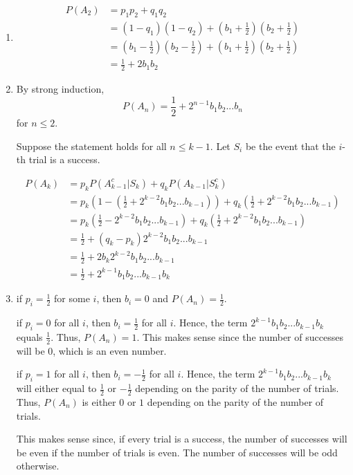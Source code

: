 \begin{enumerate}[label=(\alph*)]
\item
\begin{align*}
P(A_{2}) &= p_{1}p_{2} + q_{1}q_{2} \\
&= (1-q_{1})(1-q_{2}) + \left(b_{1} + \frac{1}{2}\right)\left(b_{2} + \frac{1}
{2}\right) \\
&= \left(b_{1} - \frac{1}{2}\right)\left(b_{2} - \frac{1}{2}\right) + \left(b_
{1} + \frac{1}{2}\right)\left(b_{2} + \frac{1}
{2}\right) \\
&= \frac{1}{2} + 2b_{1}b_{2}
\end{align*}

\item 
By strong induction, $$P(A_{n}) = \frac{1}{2} + 2^{n-1}b_{1}b_{2}...b_{n}$$ for
$n \leq 2.$

Suppose the statement holds for all $n \leq k-1$.
Let $S_{i}$ be the event that the $i$-th trial is a success.

\begin{align*}
P(A_{k}) &= p_{k}P(A_{k-1}^{c} | S_{k}) + q_{k}P(A_{k-1} | S_{k}^{c}) \\
&= p_{k}\left(1 - \left(\frac{1}{2} + 2^{k-2}b_{1}b_{2}...b_{k-1}\right)\right)
+ q_{k}\left(\frac{1}{2} + 2^{k-2}b_{1}b_{2}...b_{k-1}\right) \\
&= p_{k}\left(\frac{1}{2} - 2^{k-2}b_{1}b_{2}...b_{k-1}\right) + q_{k}\left(
\frac{1}{2} + 2^{k-2}b_{1}b_{2}...b_{k-1}\right) \\
&= \frac{1}{2} + (q_{k} - p_{k})2^{k-2}b_{1}b_{2}...b_{k-1} \\
&= \frac{1}{2} + 2b_{k}2^{k-2}b_{1}b_{2}...b_{k-1} \\
&= \frac{1}{2} + 2^{k-1}b_{1}b_{2}...b_{k-1}b_{k}
\end{align*}

\item
if $p_{i} = \frac{1}{2}$ for some $i$, then $b_{i} = 0$ and $P(A_{n}) = \frac{1}
{2}.$

if $p_{i} = 0$ for all $i$, then $b_{i} = \frac{1}{2}$ for all $i$. Hence,
the term $2^{k-1}b_{1}b_{2}...b_{k-1}b_{k}$ equals $\frac{1}{2}$. Thus, $P(A_
{n}) = 1.$ This makes sense since the number of successes will be $0$, which is
an even number.

if $p_{i} = 1$ for all $i$, then $b_{i} = -\frac{1}{2}$ for all $i$. Hence, the
term $2^{k-1}b_{1}b_{2}...b_{k-1}b_{k}$ will either equal to $\frac{1}{2}$ or $-
\frac{1}{2}$ depending on the parity of the number of trials. Thus, $P(A_{n})$
is either $0$ or $1$ depending on the parity of the number of trials.

This makes sense since, if every trial is a success, the number of successes
will be even if the number of trials is even. The number of successes will be
odd otherwise.

\end{enumerate}